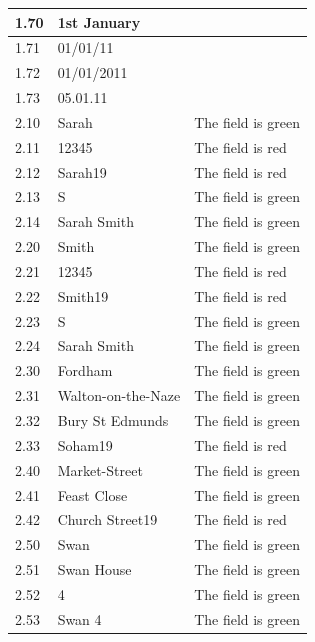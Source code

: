 \begin{center}
\begin{longtable}{|p{2cm}|p{5cm}|p{8cm}|}
        \rowcolor{darkgrey} 1.70 & 1st January &  \\ \hline
        \rowcolor{darkgrey} 1.71 & 01/01/11 &  \\ \hline
        \rowcolor{darkgrey} 1.72 & 01/01/2011 &  \\ \hline
        \rowcolor{darkgrey} 1.73 & 05.01.11 & \\ \hline
        
        2.10 & Sarah & The field is green \\ \hline
        2.11 & 12345 & The field is red \\ \hline
        2.12 & Sarah19 & The field is red\\ \hline
        2.13 & S & The field is green\\ \hline
        2.14 & Sarah Smith &  The field is green\\ \hline
        
        2.20 & Smith & The field is green \\ \hline
        2.21 & 12345 & The field is red \\ \hline
        2.22 & Smith19 & The field is red \\ \hline
        2.23 & S & The field is green \\ \hline
        2.24 & Sarah Smith & The field is green \\ \hline
        
        2.30 & Fordham & The field is green \\ \hline
        2.31 & Walton-on-the-Naze & The field is green \\ \hline
        2.32 & Bury St Edmunds & The field is green \\ \hline
        2.33 & Soham19 & The field is red \\ \hline

        2.40 & Market-Street & The field is green \\ \hline
        2.41 & Feast Close & The field is green \\ \hline
        2.42 & Church Street19 & The field is red \\ \hline
        
        2.50 & Swan & The field is green \\ \hline
        2.51 & Swan House & The field is green \\ \hline
        2.52 & 4 & The field is green \\ \hline
        2.53 & Swan 4 & The field is green \\ \hline
        

\end{longtable}
\end{center}
